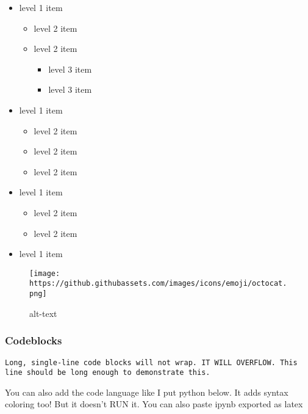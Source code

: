 \documentclass[
  12pt,
]{article}
\providecommand{\tightlist}{%
  \setlength{\itemsep}{0pt}\setlength{\parskip}{0pt}}
\begin{document}
\begin{itemize}
\tightlist
\item
  level 1 item

  \begin{itemize}
  \tightlist
  \item
    level 2 item
  \item
    level 2 item

    \begin{itemize}
    \tightlist
    \item
      level 3 item
    \item
      level 3 item
    \end{itemize}
  \end{itemize}
\item
  level 1 item

  \begin{itemize}
  \tightlist
  \item
    level 2 item
  \item
    level 2 item
  \item
    level 2 item
  \end{itemize}
\item
  level 1 item

  \begin{itemize}
  \tightlist
  \item
    level 2 item
  \item
    level 2 item
  \end{itemize}
\item
  level 1 item
\end{itemize}

\begin{figure}
\centering
\texttt{[image: https://github.githubassets.com/images/icons/emoji/octocat.png]}
\caption{alt-text}
\end{figure}

\hypertarget{codeblocks}{%
\subsubsection{Codeblocks}\label{codeblocks}}

\begin{verbatim}
Long, single-line code blocks will not wrap. IT WILL OVERFLOW. This line should be long enough to demonstrate this.
\end{verbatim}

You can also add the code language like I put python below. It adds
syntax coloring too! But it doesn't RUN it. You can also paste ipynb
exported as latex
\end{document}
